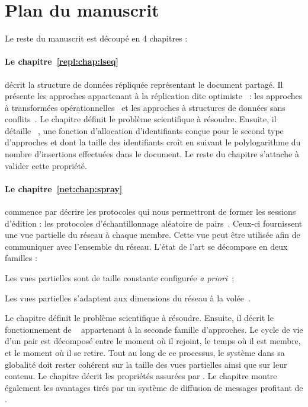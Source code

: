 
\section{Plan du manuscrit}

Le reste du manuscrit est découpé en 4 chapitres :

\paragraph{Le chapitre~\ref{repl:chap:lseq}} décrit la structure de données
répliquée représentant le document partagé. Il présente les approches
appartenant à la réplication dite optimiste~\cite{demers1987epidemic,
  saito2005optimistic} : les approches à transformées
opérationnelles~\cite{sun1998achieving, sun2009contextbased} et les approches à
structures de données sans conflits~\cite{burckhardt2014replicated,
  shapiro2011conflict}. Le chapitre définit le problème scientifique à
résoudre. Ensuite, il détaille \LSEQ~\cite{nedelec2013concurrency,
  nedelec2013lseq}, une fonction d'allocation d'identifiants conçue pour le
second type d'approches et dont la taille des identifiants croît en suivant le
polylogarithme du nombre d'insertions effectuées dans le document. Le reste du
chapitre s'attache à valider cette propriété.

\paragraph{Le chapitre~\ref{net:chap:spray}} commence par décrire les protocoles
qui nous permettront de former les sessions d'édition : les protocoles
d'échantillonnage aléatoire de pairs~\cite{jelasity2004peer,
  jelasity2007gossip}. Ceux-ci fournissent une vue partielle du réseau à chaque
membre. Cette vue peut être utilisée afin de communiquer avec l'ensemble du
réseau. L'état de l'art se décompose en deux familles :
\begin{inparaenum}[(i)]
\item Les vues partielles sont de taille constante configurée \emph{a
    priori}~\cite{eugster2003lightweight, jelasity2007gossip,
    leitao2007dependable, tolgyeski2009adaptive, voulgaris2005cyclon};
\item Les vues partielles s'adaptent aux dimensions du réseau à la
  volée~\cite{ganesh2001scamp, ganesh2003peer}.
\end{inparaenum}
Le chapitre définit le problème scientifique à résoudre. Ensuite, il décrit le
fonctionnement de \SPRAY~\cite{nedelec2015spray} appartenant à la seconde
famille d'approches. Le cycle de vie d'un pair est décomposé entre le moment où
il rejoint, le temps où il est membre, et le moment où il se retire. Tout au
long de ce processus, le système dans sa globalité doit rester cohérent sur la
taille des vues partielles ainsi que sur leur contenu.  Le chapitre décrit les
propriétés assurées par \SPRAY. Le chapitre montre également les avantages tirés
par un système de diffusion de messages profitant de \SPRAY.

